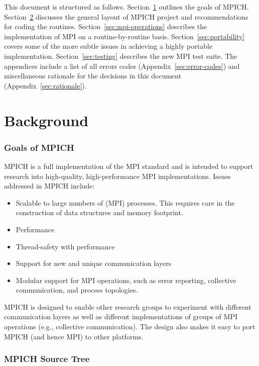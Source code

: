 \documentclass{article}
\begin{document}
This document is structured as follows.  Section~\ref{sec:goals}
outlines the goals of MPICH.  Section~\ref{sec:general} discusses
the general layout of MPICH project and recommendations for coding the
routines.  
Section~\ref{sec:mpi-operations} describes the implementation of
MPI on a routine-by-routine basis.  Section~\ref{sec:portability} covers some
of the more subtle issues in achieving a highly portable implementation.
Section~\ref{sec:testing} describes the new MPI test suite.  The appendices
include a list of all errors codes (Appendix~\ref{sec:error-codes}) and
miscellaneous rationale for the decisions in this document
(Appendix~\ref{sec:rationale}). 

\part{Background}
\section{Goals of MPICH}
\label{sec:goals}

MPICH is a full implementation of the MPI standard and is intended to
support research into high-quality, high-performance MPI
implementations.  Issues addressed in MPICH include:
\begin{itemize}
\item Scalable to large numbers of (MPI) processes.  This requires
  care in the construction of data structures and memory footprint.
\item Performance
\item Thread-safety with performance
\item Support for new and unique communication layers
\item Modular support for MPI operations, such as error reporting,
 collective communication, and process topologies.
\end{itemize}
MPICH is designed to enable other research groups to experiment with
different communication layers as well as different implementations of
groups of MPI operations (e.g., collective communication).  The design
also makes it easy to port MPICH (and hence MPI) to other platforms.

\section{MPICH Source Tree}
\label{sec:general}
\end{document}
